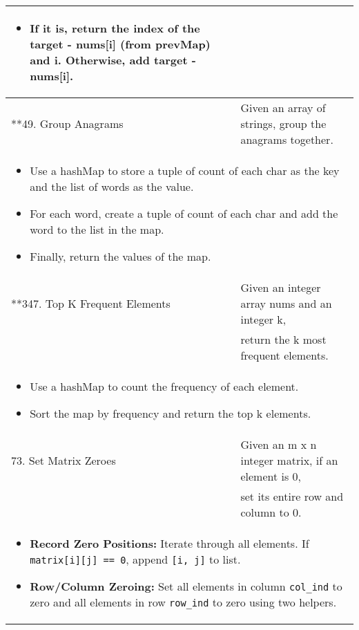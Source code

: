 \begin{summary}
\begin{center}
\begin{tabular}{ll}
{\begin{itemize}
\begin{itemize}
                        \item If it is, return the index of the target - nums[i] (from prevMap) and i. Otherwise, add target - nums[i].
                    \end{itemize}
                \end{itemize}
            } \\
            \midrule
            **49. Group Anagrams & Given an array of strings, group the anagrams together. \\
            \multicolumn{2}{p{\linewidth}}{
                \begin{itemize}
                    \item Use a hashMap to store a tuple of count of each char as the key and the list of words as the value.
                    \item For each word, create a tuple of count of each char and add the word to the list in the map.
                    \item Finally, return the values of the map.
                \end{itemize}
            } \\
            \midrule
            **347. Top K Frequent Elements & Given an integer array nums and an integer k, \\
            & return the k most frequent elements. \\
            \multicolumn{2}{p{\linewidth}}{
                \begin{itemize}
                    \item Use a hashMap to count the frequency of each element.
                    \item Sort the map by frequency and return the top k elements.
                \end{itemize}
            } \\
            \midrule
            73. Set Matrix Zeroes & Given an m x n integer matrix, if an element is 0, \\
            & set its entire row and column to 0. \\
            \multicolumn{2}{p{\linewidth}}{
                \begin{itemize}                
                    \item \textbf{Record Zero Positions:} Iterate through all elements. If \texttt{matrix[i][j] == 0}, append \texttt{[i, j]} to list.
                    \item \textbf{Row/Column Zeroing:} Set all elements in column \texttt{col\_ind} to zero and all elements in row \texttt{row\_ind} to zero using two helpers.
                \end{itemize}                
            } \\
            \bottomrule
        \end{tabular}
    \end{center}
\end{summary}